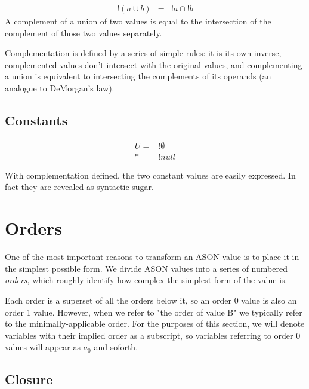 \documentclass[letterpaper]{article}
\begin{document}
\begin{prule}
\label{sec:demorgan}
\begin{equation}
\begin{array}{rcl}
	! (a \cup b) &=& !a \cap !b
\end{array}
\end{equation}
A complement of a union of two values is equal to the intersection of the
complement of those two values separately.
\end{prule}

Complementation is defined by a series of simple rules: it is its own inverse,
complemented values don't intersect with the original values, and complementing
a union is equivalent to intersecting the complements of its operands (an
analogue to DeMorgan's law).

\subsection{Constants}
\begin{equation}
\begin{split}
U = &!\emptyset \\
* = &!null
\end{split}
\end{equation}

With complementation defined, the two constant values are easily expressed. In
fact they are revealed as syntactic sugar.

\section{Orders}

One of the most important reasons to transform an ASON value is to place it in
the simplest possible form. We divide ASON values into a series of numbered
\textit{orders}, which roughly identify how complex the simplest form of the
value is.

Each order is a superset of all the orders below it, so an order 0 value is
also an order 1 value. However, when we refer to "the order of value B" we
typically refer to the minimally-applicable order. For the purposes of this
section, we will denote variables with their implied order as a subscript, so
variables referring to order 0 values will appear as \(a_0\) and soforth.

\subsection{Closure}
\end{document}
